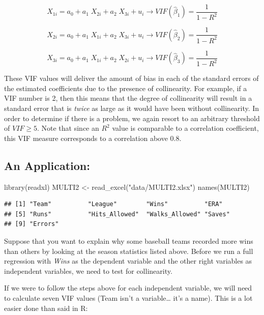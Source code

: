 \documentclass[
]{book}
\newenvironment{Shaded}{\begin{snugshade}}{\end{snugshade}}
\newcommand{\FunctionTok}[1]{\textcolor[rgb]{0.00,0.00,0.00}{#1}}
\newcommand{\NormalTok}[1]{#1}
\newcommand{\OtherTok}[1]{\textcolor[rgb]{0.56,0.35,0.01}{#1}}
\newcommand{\StringTok}[1]{\textcolor[rgb]{0.31,0.60,0.02}{#1}}
\begin{document}
\[X_{1i} = a_0 + a_1 \; X_{2i} + a_2\;  X_{3i} + u_i \rightarrow VIF(\hat{\beta}_1) = \frac{1}{1-R^2}\]

\[X_{2i} = a_0 + a_1 \; X_{1i} + a_2 \; X_{3i} + u_i \rightarrow VIF(\hat{\beta}_2) = \frac{1}{1-R^2}\]

\[X_{3i} = a_0 + a_1 \; X_{1i} + a_2 \; X_{2i} + u_i \rightarrow VIF(\hat{\beta}_3) = \frac{1}{1-R^2}\]

These VIF values will deliver the amount of bias in each of the standard errors of the estimated coefficients due to the presence of collinearity. For example, if a VIF number is 2, then this means that the degree of collinearity will result in a standard error that is \emph{twice} as large as it would have been without collinearity. In order to determine if there is a problem, we again resort to an arbitrary threshold of \(VIF \geq 5\). Note that since an \(R^2\) value is comparable to a correlation coefficient, this VIF measure corresponds to a correlation above 0.8.

\hypertarget{an-application-2}{%
\subsection{An Application:}\label{an-application-2}}

\begin{Shaded}
\begin{Highlighting}[]
\FunctionTok{library}\NormalTok{(readxl)}
\NormalTok{MULTI2 }\OtherTok{\textless{}{-}} \FunctionTok{read\_excel}\NormalTok{(}\StringTok{"data/MULTI2.xlsx"}\NormalTok{)}
\FunctionTok{names}\NormalTok{(MULTI2)}
\end{Highlighting}
\end{Shaded}

\begin{verbatim}
## [1] "Team"          "League"        "Wins"          "ERA"          
## [5] "Runs"          "Hits_Allowed"  "Walks_Allowed" "Saves"        
## [9] "Errors"
\end{verbatim}

Suppose that you want to explain why some baseball teams recorded more wins than others by looking at the season statistics listed above. Before we run a full regression with \emph{Wins} as the dependent variable and the other right variables as independent variables, we need to test for collinearity.

If we were to follow the steps above for each independent variable, we will need to calculate seven VIF values (Team isn't a variable\ldots{} it's a name). This is a lot easier done than said in R:
\end{document}
